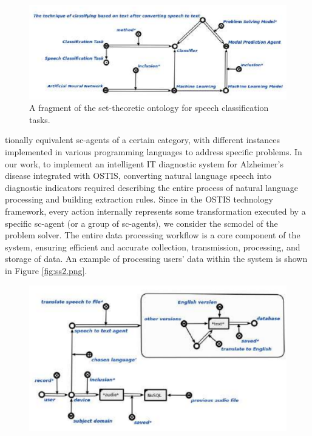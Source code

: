 \documentclass[10pt, a4paper]{article}
\begin{document}
\begin{SCn}
\begin{small}
\newpage
\begin{multicols}{2}
\fontsize {10}{13}\selectfont
\vspace{-0.7cm}
\setcounter{figure}{1}
\begin{figure}[H]
\centering
 \includegraphics[width=0.9\linewidth]{ss1.png}
 \caption{\small A fragment of the set-theoretic ontology for speech classification tasks.}
  \label{fig:ss1.png}
\end{figure}
\noindent
tionally equivalent sc-agents of a certain category, with
different instances implemented in various programming
languages to address specific problems. In our work,
to implement an intelligent IT diagnostic system for
Alzheimer’s disease integrated with OSTIS, converting
natural language speech into diagnostic indicators required describing the entire process of natural language
processing and building extraction rules. Since in the
OSTIS technology framework, every action internally
represents some transformation executed by a specific
sc-agent (or a group of sc-agents), we consider the scmodel of the problem solver. The entire data processing
workflow is a core component of the system, ensuring efficient and accurate collection, transmission, processing,
and storage of data. An example of processing users’ data
within the system is shown in Figure  \ref{fig:ss2.png}.\\
\vspace{-0.1cm}
\setcounter{figure}{2}
\begin{figure}[H]
\centering
 \includegraphics[width=1\linewidth]{ss2.png}

\end{figure}
\end{multicols}
\end{small}
\end{SCn}
\end{document}
